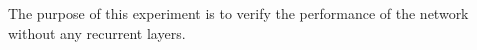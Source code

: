 
The purpose of this experiment is to verify the performance
of the network without any recurrent layers.

